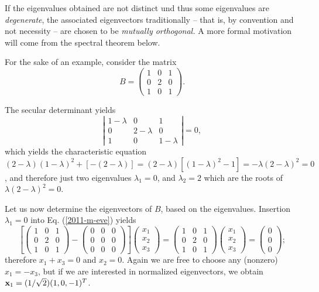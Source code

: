 If the eigenvalues obtained are not distinct und thus some eigenvalues are {\em degenerate},
the associated eigenvectors traditionally -- that is, by convention and not necessity -- are chosen to be
{\em mutually orthogonal.}
A more formal motivation will come from the spectral theorem below.


{\color{blue}
\bexample
For the sake of an example, consider  the
{matrix}
\begin{equation}
B=
\begin{pmatrix}
1&0&1\\
0&2&0\\
1&0&1
\end{pmatrix}.
\end{equation}

The secular determinant yields
$$
\left|
\begin{matrix}
1-\lambda &0&1\\
0&2-\lambda &0\\
1&0&1-\lambda
\end{matrix}
\right| = 0,
$$
which yields the characteristic equation
$
(2-\lambda )(1-\lambda )^2 +[-(2-\lambda )]=
(2-\lambda )[(1-\lambda )^2 -1]=
-\lambda (2-\lambda )^2 =0$,
and therefore just two  eigenvalues
$\lambda_1=0$,  and
$\lambda_2=2$ which are the roots of $\lambda (2-\lambda )^2 =0$.

Let us now determine the eigenvectors of $B$, based on the eigenvalues.
Insertion  $\lambda_1=0$ into Eq. (\ref{2011-m-eve})  yields
\begin{equation}
\left[
\begin{pmatrix}
1&0&1\\
0&2&0\\
1&0&1
\end{pmatrix}  -
\begin{pmatrix}
0&0&0\\
0&0&0\\
0&0&0
\end{pmatrix}
\right]
\begin{pmatrix}
x_1\\
x_2\\
x_3
\end{pmatrix}
=
\begin{pmatrix}
1&0&1\\
0&2&0\\
1&0&1
\end{pmatrix}
\begin{pmatrix}
x_1\\
x_2\\
x_3
\end{pmatrix}
=
\begin{pmatrix}
0\\
0\\
0
\end{pmatrix}
;
\end{equation}
therefore $x_1+x_3=0$ and $x_2=0$.
Again we are free to choose any (nonzero) $x_1=-x_3$,
but if we are interested in normalized eigenvectors, we obtain
${\bf x}_1 =(1/\sqrt{2})(1,0,-1)^T$.

}

